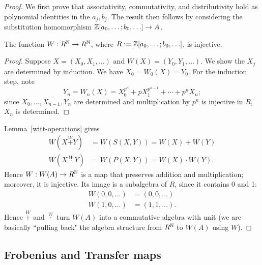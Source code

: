 \begin{proof}
We first prove that associativity, commutativity, and distributivity hold as polynomial identities in the $a_j,b_j$. 
The result then follows by considering the substitution homomorphism $\mathbb{Z}[a_0,\ldots;b_0,\ldots]\to A$.

\begin{lem}
The function $W:R^{\mathbb{N}}\to R^{\mathbb{N}}$, where $R:= \mathbb{Z}[a_0,\ldots;b_0,\ldots]$, is injective.
\end{lem}
\begin{proof}
Suppose $X=(X_0,X_1,\ldots)$ and $W(X)=(Y_0,Y_1,\ldots)$. We show the $X_j$ are determined by induction. We have $X_0=W_0(X)=Y_0$. For the induction step, note
\[
Y_n=W_{n}(X)=X_0^{p^n}+pX_1^{p^{n-1}}+\cdots +p^nX_n;
\]
since $X_0,\ldots, X_{n-1},Y_n$ are determined and multiplication by $p^n$ is injective in $R$, $X_n$ is determined.
\end{proof}
Lemma~\ref{witt-operations} gives
\begin{align*}
W(X\stackrel W+Y)&=W(S(X,Y))=W(X)+W(Y)\\
W(X\stackrel W{\cdot} Y)&=W(P(X,Y))=W(X)\cdot W(Y).
\end{align*}
Hence $W:W(A)\to R^{\mathbb{N}}$ is a map that preserves addition and multiplication; moreover, it is injective. Its image is a subalgebra of $R$, since it contains 0 and 1:
\begin{align*}
W(0,0,\ldots)&=(0,0,\ldots)\\
W(1,0,\ldots)&=(1,1,\ldots).
\end{align*}
Hence $\stackrel{W}{+}$ and $\stackrel{W}{\cdot}$ turn $W(A)$ into a commutative algebra with unit (we are basically ``pulling back" the algebra structure from $R^{\mathbb{N}}$ to $W(A)$ using $W$).
\end{proof}
\subsection{Frobenius and Transfer maps} %

